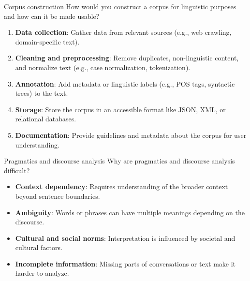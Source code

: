 \documentclass{article}
\begin{document}
\setcounter{section}{2021}

\begin{exercise}{Corpus construction}
  How would you construct a corpus for linguistic purposes and how can it be made usable?

  \begin{solution}
    \begin{enumerate}
        \item \textbf{Data collection}: Gather data from relevant sources (e.g., web crawling, domain-specific text).
        \item \textbf{Cleaning and preprocessing}: Remove duplicates, non-linguistic content, and normalize text (e.g., case normalization, tokenization).
        \item \textbf{Annotation}: Add metadata or linguistic labels (e.g., POS tags, syntactic trees) to the text.
        \item \textbf{Storage}: Store the corpus in an accessible format like JSON, XML, or relational databases.
        \item \textbf{Documentation}: Provide guidelines and metadata about the corpus for user understanding.
    \end{enumerate}
  \end{solution}
\end{exercise}

\begin{exercise}{Pragmatics and discourse analysis}
  Why are pragmatics and discourse analysis difficult?

  \begin{solution}
    \begin{itemize}
        \item \textbf{Context dependency}: Requires understanding of the broader context beyond sentence boundaries.
        \item \textbf{Ambiguity}: Words or phrases can have multiple meanings depending on the discourse.
        \item \textbf{Cultural and social norms}: Interpretation is influenced by societal and cultural factors.
        \item \textbf{Incomplete information}: Missing parts of conversations or text make it harder to analyze.
    \end{itemize}
  \end{solution}
\end{exercise}
\end{document}
